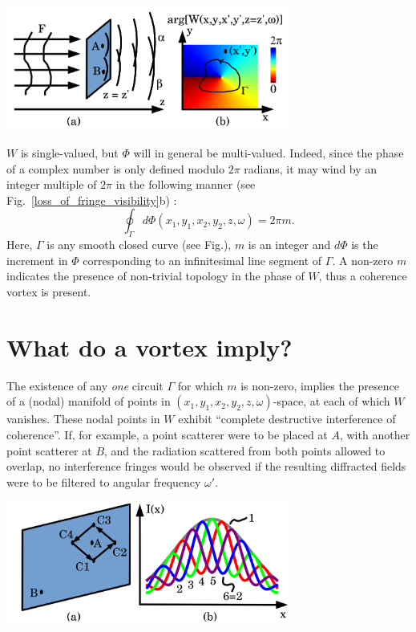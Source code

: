 \documentclass[a4paper,10pt]{article}
\begin{document}
\includegraphics[width=0.7\textwidth]{Figures/coherence_vortex.png}
 
 
$W$ is single-valued, but $\Phi$ will in general be multi-valued. Indeed, since the phase of a complex number is only defined modulo $2\pi$ radians, it may wind by an integer multiple of $2\pi$ in the following manner (see Fig.~\ref{loss_of_fringe_visibility}b) \cite{GburVisser2003}: 
\begin{equation}
\label{phase_of_W_winding}
\oint_{\Gamma} d\Phi(x_1,y_1,x_2,y_2,z,\omega)=2\pi m.
\end{equation}
Here, $\Gamma$ is any smooth closed curve (see Fig.), $m$ is an integer and $d\Phi$ is the increment in $\Phi$ corresponding to an infinitesimal line segment of $\Gamma$.
A non-zero $m$ indicates the presence of non-trivial topology in the phase of $W$, thus a coherence vortex \cite{GburVisser2003} is present.  

\section{What do a vortex imply?}

The existence of any {\em one} circuit $\Gamma$ for which $m$ is non-zero, implies the presence of a (nodal) manifold of points in $(x_1,y_1,x_2,y_2,z,\omega)$-space, at each of which $W$ vanishes. These nodal points in $W$ exhibit ``complete destructive interference of coherence''. If, for example, a point scatterer were to be placed at $A$, with another point scatterer at $B$, and the radiation scattered from both points allowed to overlap, no interference fringes would be observed if the resulting diffracted fields were to be filtered to angular frequency $\omega'$.

\includegraphics[width=0.7\textwidth]{Figures/Anholonomy.png}
 
\end{document}
